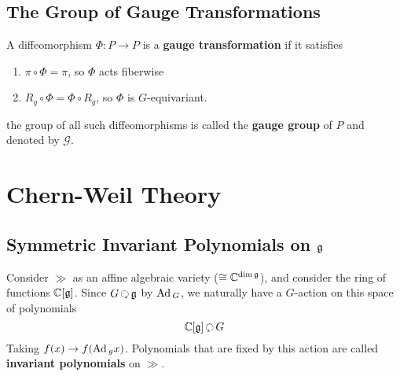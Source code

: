 		
		
		\subsection{The Group of Gauge Transformations}
			A diffeomorphism $\Phi: P \to P$ is a \textbf{gauge transformation} if it satisfies
			\begin{enumerate}
				\item $\pi \circ \Phi = \pi$, so $\Phi$ acts fiberwise
				\item $R_g \circ \Phi = \Phi \circ R_g$, so $\Phi$ is $G$-equivariant.
			\end{enumerate}
			the group of all such diffeomorphisms is called the \textbf{gauge group} of $P$ and denoted by $\mathcal G$.
		
		
		\section{Chern-Weil Theory}
		
		\subsection{Symmetric Invariant Polynomials on $\frak g$}
		
		Consider $\gg$ as an affine algebraic variety ($\cong \mathbb{C}^{\dim \frak{g}}$), and consider the ring of functions $\mathbb{C} [\frak{g}]$. Since $G \lacts \gg$ by $\mathrm{Ad}\,_G$, we naturally have a $G$-action on this space of polynomials
		\[
			\cc [\gg] \racts G
		\]
		Taking $f(x) \to f(\mathrm{Ad}\,_g x)$. Polynomials that are fixed by this action are called \textbf{invariant polynomials} on $\gg$.
		
		